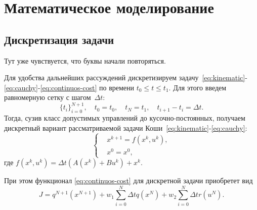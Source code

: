 \section{Математическое моделирование}

\subsection{Дискретизация задачи}

{\color{red} Тут уже чувствуется, что буквы начали повторяться.}

Для удобства дальнейших рассуждений дискретизируем задачу~\eqref{eq:kinematic}-\eqref{eq:cauchy}-\eqref{eq:continuos-cost} по времени $t_0 \leqslant t \leqslant t_1$.
Для этого введем равномерную сетку с шагом~$\Delta t$:
$$
    \{ t_i \}_{i=0}^{N+1}, \quad t_0 = t_0, \quad t_N = t_1, \quad t_{i+1} - t_{i} = \Delta t.
$$
Тогда, сузив класс допустимых управлений до кусочно-постоянных, получаем дискретный вариант рассматриваемой задачи Коши~\eqref{eq:kinematic}-\eqref{eq:cauchy}:
\begin{equation}\label{eq:discrete-system}
    \left\{\begin{aligned}
        &x^{k+1} = f(x^k, u^k), \\
        &x^{0} = x^{0},
    \end{aligned}\right.
\end{equation}
где $f(x^k, u^k) = \Delta t (A(x^k) + B u^k) + x^k$.

При этом функционал \eqref{eq:continuos-cost} для дискретной задачи приобретет вид
\begin{equation}\label{eq:discrete-cost}
    J = q^{N+1}(x^{N+1}) + w_1 \sum_{i=0}^{N} \Delta t q(x^N) + w_2 \sum_{i=0}^{N} \Delta t r(u^N).
\end{equation}
